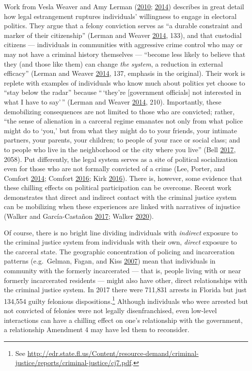 \documentclass[
  12pt,
]{article}
\begin{document}
Work from Vesla Weaver and Amy Lerman (\protect\hyperlink{ref-Weaver2010}{2010}; \protect\hyperlink{ref-Lerman2014}{2014}) describes in great detail how legal estrangement ruptures individuals' willingness to engage in electoral politics. They argue that a felony conviction serves as ``a durable constraint and marker of their citizenship'' (Lerman and Weaver \protect\hyperlink{ref-Lerman2014}{2014}, 133), and that custodial citizens --- individuals in communities with aggressive crime control who may or may not have a criminal history themselves --- ``become less likely to believe that they (and those like them) can change \emph{the system}, a reduction in external efficacy'' (Lerman and Weaver \protect\hyperlink{ref-Lerman2014}{2014}, 137, emphasis in the original). Their work is replete with examples of individuals who know much about politics yet choose to ``stay below the radar'' because ``\,`they're {[}government officials{]} not interested in what I have to say'\,'' (Lerman and Weaver \protect\hyperlink{ref-Lerman2014}{2014}, 210). Importantly, these demobilizing consequences are not limited to those who are convicted; rather, ``the sense of alienation in a carceral regime emanates not only from what police might do to `you,' but from what they might do to your friends, your intimate partners, your parents, your children; to people of your race or social class; and to people who live in the neighborhood or the city where you live'' (Bell \protect\hyperlink{ref-Bell2017}{2017}, 2058). Put differently, the legal system serves as a site of political socialization even for those who are not formally convicted of a crime (Lee, Porter, and Comfort \protect\hyperlink{ref-Lee2014}{2014}; Comfort \protect\hyperlink{ref-Comfort2016}{2016}; Kirk \protect\hyperlink{ref-Kirk2016}{2016}). There is, however, some evidence that these chilling effects on political participation can be overcome. Recent work demonstrates that direct and indirect contact with the criminal justice system can be mobilizing when these experiences are linked with narratives of injustice (Walker and García-Castañon \protect\hyperlink{ref-Walker2017}{2017}; Walker \protect\hyperlink{ref-Walker2020}{2020}).

Of course, there is no bright line dividing individuals with \emph{indirect} exposure to the criminal justice system from individuals with their own, \emph{direct} exposure to the carceral state. The geographic concentration of policing and incarceration patterns (e.g.~Gelman, Fagan, and Kiss \protect\hyperlink{ref-Gelman2007}{2007}) mean that individuals in community with the formerly incarcerated --- that is, people living with or near formerly incarcerated residents --- might also have other, direct relationships with the criminal justice system. In 2017 there were 711,831 arrests in Florida but just 134,554 guilty felonious dispositions.\footnote{See \url{http://edr.state.fl.us/Content/resource-demand/criminal-justice/reports/criminal-justice/cj7.pdf}.} Although individuals who were arrested but not convicted of felonies were not legally disenfranchised, even low-level interactions can have a chilling effect on one's relationship with the government, a relationship Amendment 4 may have led them to reconsider.
\end{document}
